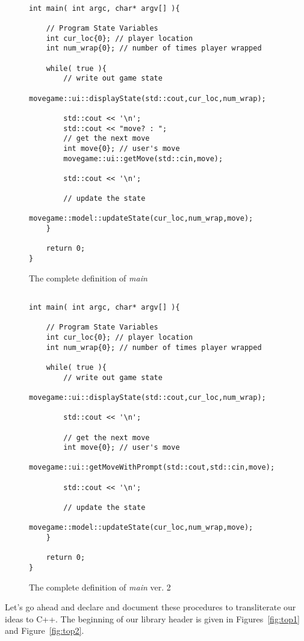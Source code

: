 \documentclass[nobib]{tufte-handout}
\begin{document}
\begin{figure}[!htbp]
\begin{lstlisting}

int main( int argc, char* argv[] ){

	// Program State Variables
	int cur_loc{0}; // player location
	int num_wrap{0}; // number of times player wrapped

	while( true ){
		// write out game state
		movegame::ui::displayState(std::cout,cur_loc,num_wrap);

		std::cout << '\n';
		std::cout << "move? : ";
		// get the next move
		int move{0}; // user's move
		movegame::ui::getMove(std::cin,move);

		std::cout << '\n';

		// update the state
		movegame::model::updateState(cur_loc,num_wrap,move);
	}

	return 0;
}
\end{lstlisting}
\caption{The complete definition of \textit{main}}
\label{fig:main-final1}
\end{figure}




\begin{figure}[!htbp]
\begin{lstlisting}

int main( int argc, char* argv[] ){

	// Program State Variables
	int cur_loc{0}; // player location
	int num_wrap{0}; // number of times player wrapped

	while( true ){
		// write out game state
		movegame::ui::displayState(std::cout,cur_loc,num_wrap);

		std::cout << '\n';

		// get the next move
		int move{0}; // user's move
		movegame::ui::getMoveWithPrompt(std::cout,std::cin,move);

		std::cout << '\n';

		// update the state
		movegame::model::updateState(cur_loc,num_wrap,move);
	}

	return 0;
}
\end{lstlisting}
\caption{The complete definition of \textit{main} ver. 2}
\label{fig:main-final2}
\end{figure}

Let's go ahead and declare and document these procedures to transliterate our ideas to C++.  The beginning of our library header is given in Figures~\ref{fig:top1} and Figure~\ref{fig:top2}.
\end{document}
